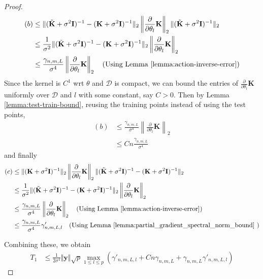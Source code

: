 \begin{proof}
\begin{align*}
(b) &\leq \|(\tilde{\mathbf{K}} + \sigma^2 \mathbf{I})^{-1} - (\mathbf{K} + \sigma^2 \mathbf{I})^{-1}\|_2 \left\|\frac{\partial}{\partial \theta_l} \mathbf{K}\right\|_2 \|(\tilde{\mathbf{K}} + \sigma^2 \mathbf{I})^{-1}\|_2 \\
&\leq \frac{1}{\sigma^2} \|(\tilde{\mathbf{K}} + \sigma^2 \mathbf{I})^{-1} - (\mathbf{K} + \sigma^2 \mathbf{I})^{-1}\|_2 \left\|\frac{\partial}{\partial \theta_l} \mathbf{K}\right\|_2 \\
&\leq \frac{\gamma_{n,m,L}}{\sigma^4} \left\|\frac{\partial}{\partial \theta_l} \mathbf{K}\right\|_2 \quad \text{(Using Lemma \ref{lemma:action-inverse-error})}
\end{align*}
Since the kernel is $C^1$ wrt $\theta$ and $\mathcal{D}$ is compact, we can bound the entries of $\frac{\partial}{\partial \theta_l} \mathbf{K}$ uniformly over $\mathcal{D}$ and $l$ with some constant, say $C>0$. Then by Lemma \ref{lemma:test-train-bound}, reusing the training points instead of using the test points,
\begin{align*}
    (b)&\leq \frac{\gamma_{n,m,L}}{\sigma^4} \left\|\frac{\partial}{\partial \theta_l} \mathbf{K}\right\|_2\\
    &\leq Cn\frac{\gamma_{n,m,L}}{\sigma^4}
\end{align*}
and finally 
\begin{align*}
(c) &\leq \|(\mathbf{K} + \sigma^2 \mathbf{I})^{-1}\|_2 \left\|\frac{\partial}{\partial \theta_l} \mathbf{K}\right\|_2 \|(\tilde{\mathbf{K}} + \sigma^2 \mathbf{I})^{-1} - (\mathbf{K} + \sigma^2 \mathbf{I})^{-1}\|_2 \\
&\leq \frac{1}{\sigma^2} \|(\tilde{\mathbf{K}} + \sigma^2 \mathbf{I})^{-1} - (\mathbf{K} + \sigma^2 \mathbf{I})^{-1}\|_2 \left\|\frac{\partial}{\partial \theta_l} \mathbf{K}\right\|_2 \\
&\leq \frac{\gamma_{n,m,L}}{\sigma^4} \left\|\frac{\partial}{\partial \theta_l} \mathbf{K}\right\|_2 \quad \text{(Using Lemma \ref{lemma:action-inverse-error})} \\
&\leq \frac{\gamma_{n,m,L}}{\sigma^4} \gamma'_{n,m,L,l} \quad \text{(Using Lemma \ref{lemma:partial_gradient_spectral_norm_bound} )}
\end{align*}

Combining these, we obtain
\begin{align*}
    T_1 &\leq \frac{1}{2\sigma^4}\Vert \textbf{y}\Vert\sqrt{p}\max_{1\leq l\leq p} \left( \gamma'_{n,m,L,l}+Cn\gamma_{n,m,L}+\gamma_{n,m,L}\gamma'_{n,m,L,l} \right)
\end{align*}


\end{proof}
